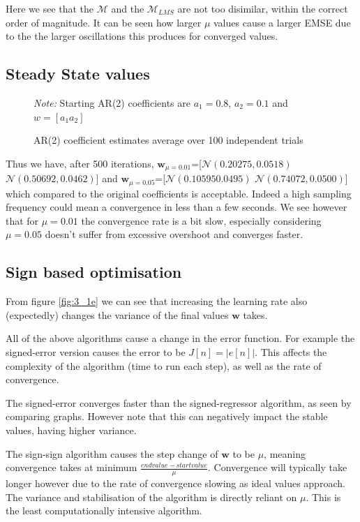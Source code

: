\documentclass[10pt,twoside,a4paper]{report}
\begin{document}
Here we see that the $\mathcal{M}$ and the $\mathcal{M}_{LMS}$ are not too disimilar, within the correct order of magnitude. It can be seen how larger $\mu$ values cause a larger EMSE due to the the larger oscillations this produces for converged values.

\subsection{Steady State values}
\begin{figure}[h!]
\centering
\resizebox{\textwidth}{!}{}
\textit{Note:} Starting AR(2) coefficients are $a_1=0.8$, $a_2 = 0.1$ and $w=[a_1 a_2]$
\caption{AR(2) coefficient estimates average over 100 independent trials}
\label{fig:3_1d}
\end{figure}

Thus we have, after 500 iterations, $\mathbf{w}_{\mu=0.01}$=[$\mathcal{N}(0.20275, 0.0518)$ $\mathcal{N}(0.50692,0.0462)$] and $\mathbf{w}_{\mu=0.05}$=[$\mathcal{N}(0.10595  0.0495)$ $\mathcal{N}(0.74072,0.0500)$] which compared to the original coefficients is acceptable.  Indeed a high sampling frequency could mean a convergence in less than a few seconds. We see however that for $\mu = 0.01$ the convergence rate is a bit slow, especially considering $\mu = 0.05$ doesn't suffer from excessive overshoot and converges faster.


\subsection{Sign based optimisation}
\FloatBarrier


From figure \ref{fig:3_1e} we can see that increasing the learning rate also (expectedly) changes the variance of the final values $\mathbf{w}$ takes.

All of the above algorithms cause a change in the error function. For example the signed-error version causes the error to be $J[n] = |e[n]|$. This affects the complexity of the algorithm (time to run each step), as well as the rate of convergence.


The signed-error converges faster than the signed-regressor algorithm, as seen by comparing graphs. However note that this can negatively impact the stable values, having higher variance.


The sign-sign algorithm causes the step change of $\mathbf{w}$ to be $\mu$, meaning convergence takes at minimum $\frac{end value - start value}{\mu}$. Convergence will typically take longer however due to the rate of convergence slowing as ideal values approach. The variance and stabilisation of the algorithm is directly reliant on $\mu$. This is the least computationally intensive algorithm.
\end{document}
